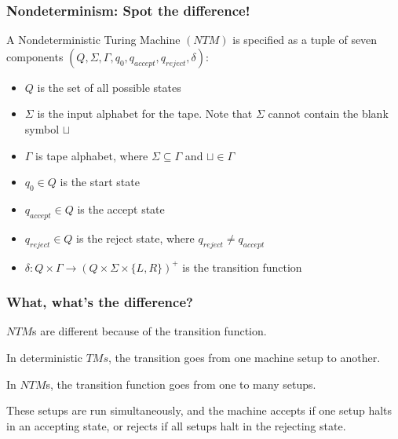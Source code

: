 \documentclass[aspectratio=169]{beamer}
\begin{document}
\begin{frame}
\frametitle{Nondeterminism: Spot the difference!}
A Nondeterministic Turing Machine $(NTM)$ is specified as a tuple of seven components $(Q, \Sigma, \Gamma, q_0, q_{accept}, q_{reject}, \delta)$:

\begin{itemize}
    \item<1-> $Q$ is the set of all possible states
    \item<2-> $\Sigma$ is the input alphabet for the tape. Note that $\Sigma$ cannot contain the blank symbol $\sqcup$
    \item<3-> $\Gamma$ is tape alphabet, where $\Sigma \subseteq \Gamma$ and $\sqcup \in \Gamma$
    \item<4-> $q_0 \in Q$ is the start state
    \item<5-> $q_{accept} \in Q$ is the accept state
    \item<6-> $q_{reject} \in Q$ is the reject state, where $q_{reject} \neq q_{accept}$
    \item<7-> $\delta: Q \times \Gamma \to (Q \times \Sigma \times \{L, R\})^+$ is the transition function
\end{itemize}
\end{frame}

\begin{frame}
\frametitle{What, what's the difference?}
$NTM$s are different because of the transition function.

In deterministic $TMs$, the transition goes from one machine setup to another.

In $NTM$s, the transition function goes from one to many setups.

These setups are run simultaneously, and the machine accepts if one setup halts in an accepting state, or rejects if all setups halt in the rejecting state.

\begin{center}
\end{center}
\end{frame}
\end{document}
